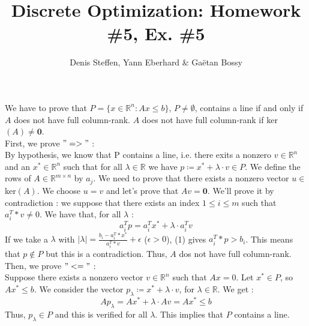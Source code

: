 \documentclass[a4paper,11pt,french]{article}
\title{Discrete Optimization: Homework \#5, Ex. \#5}
\author{Denis Steffen, Yann Eberhard \& Gaëtan Bossy}
\begin{document}
    
    \maketitle
    
    We have to prove that $P = \{ x \in \mathbb{R}^n : Ax \leq b\}$, $P \not = \emptyset $, contains a line if and only if $A$ does not have full column-rank.
    $A$ does not have full column-rank if ker$(A) \not = \mathbf 0$. 
\\

    First, we prove  $"=>"$ : \\
    By hypothesis, we know that P contains a line, i.e. there exits a nonzero $v \in \mathbb{R}^n$ and an $x^* \in \mathbb{R}^n$ such that for all $\lambda \in \mathbb{R}$ we have $ p \coloneqq x^* + \lambda \cdot v \in P$. 
    We define the rows of $A \in \mathbb{R}^{m \times n}$ by $a_j$.
    We need to prove that there exists a nonzero vector $u \in$ ker$(A)$. We choose $u = v$ and let's prove that $Av = \mathbf 0$.  
    We'll prove it by contradiction : we suppose that there exists an index $1 \leq i \leq m$ such that $a_i^T*v \not = 0$. We have that, for all $\lambda$ : 
    \begin{equation}
        a_i^Tp = a_i^Tx^* + \lambda \cdot a_i^Tv
    \end{equation}
    If we take a $\lambda$ with $\left| \lambda \right| = \frac{ b_i - a_i^T*x^*}{a_i^T*v} + \epsilon$ ($\epsilon > 0$), (1) gives $a_i^T*p > b_i$. 
    This means that $p \not \in P$ but this is a contradiction. Thus, $A$ dos not have full column-rank.
    \\

    Then, we prove $"<="$ : 
    \\ Suppose there exists a nonzero vector $v \in \mathbb{R}^n$ such that $Ax = 0$. 
    Let $x^* \in P$, so $Ax^* \leq b$. We consider the vector $p_\lambda \coloneqq x^* + \lambda \cdot v$, for $\lambda \in \mathbb{R}$. 
    We get : 
    \begin{equation*}
        Ap_\lambda = Ax^* + \lambda \cdot Av = Ax^* \leq b
    \end{equation*}
    Thus, $p_\lambda \in P$ and this is verified for all $\lambda$. This implies that $P$ contains a line.

    
    
\end{document}
